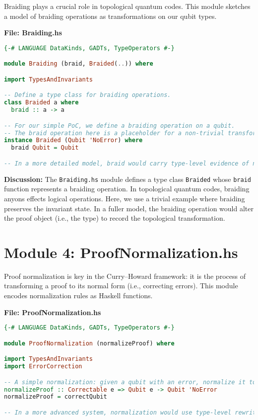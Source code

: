 \documentclass[12pt]{article}
\begin{document}
Braiding plays a crucial role in topological quantum codes. This module sketches a model of braiding operations as transformations on our qubit types.

\bigskip

\noindent\textbf{File: Braiding.hs}
\begin{lstlisting}[language=Haskell, caption={Braiding.hs}]
{-# LANGUAGE DataKinds, GADTs, TypeOperators #-}

module Braiding (braid, Braided(..)) where

import TypesAndInvariants

-- Define a type class for braiding operations.
class Braided a where
  braid :: a -> a

-- For our simple PoC, we define a braiding operation on a qubit.
-- The braid operation here is a placeholder for a non-trivial transformation.
instance Braided (Qubit 'NoError) where
  braid Qubit = Qubit

-- In a more detailed model, braid would carry type-level evidence of non-trivial braiding.
\end{lstlisting}

\bigskip

\noindent\textbf{Discussion:}  
The \texttt{Braiding.hs} module defines a type class \texttt{Braided} whose \texttt{braid} function represents a braiding operation. In topological quantum codes, braiding anyons effects logical operations. Here, we use a trivial example where braiding preserves the invariant state. In a fuller model, the braiding operation would alter the proof object (i.e., the type) to record the topological transformation.

\newpage

\section{Module 4: ProofNormalization.hs}

Proof normalization is key in the Curry–Howard framework: it is the process of transforming a proof to its normal form (i.e., correcting errors). This module encodes normalization rules as Haskell functions.

\bigskip

\noindent\textbf{File: ProofNormalization.hs}
\begin{lstlisting}[language=Haskell, caption={ProofNormalization.hs}]
{-# LANGUAGE DataKinds, GADTs, TypeOperators #-}

module ProofNormalization (normalizeProof) where

import TypesAndInvariants
import ErrorCorrection

-- A simple normalization: given a qubit with an error, normalize it to the error-free state.
normalizeProof :: Correctable e => Qubit e -> Qubit 'NoError
normalizeProof = correctQubit

-- In a more advanced system, normalization would use type-level rewriting rules.
\end{lstlisting}
\end{document}
